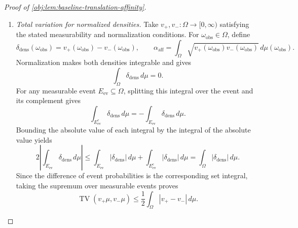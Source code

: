 \documentclass[11pt]{article}
\begin{document}
\begin{proof}[Proof of \cref{obj:lem:baseline-translation-affinity}]
\begin{enumerate}
For completeness, the product-defect bound follows by induction over subsets
\(\mathcal J\subseteq\{1,\ldots,B\}\). Every such product lies in \([0,1]\), and the empty subset gives equality. For
\(\ell_0\in\{1,\ldots,B\}\setminus\mathcal J\), the induction step is
\[
\begin{aligned}
1-\alpha_{\mathrm{aff},\ell_0}
      \prod_{\ell\in\mathcal J}\alpha_{\mathrm{aff},\ell}
&=(1-\alpha_{\mathrm{aff},\ell_0})
  +\alpha_{\mathrm{aff},\ell_0}
     \left(1-\prod_{\ell\in\mathcal J}\alpha_{\mathrm{aff},\ell}\right)\\
&\le (1-\alpha_{\mathrm{aff},\ell_0})
     +1-\prod_{\ell\in\mathcal J}\alpha_{\mathrm{aff},\ell}\\
&\le (1-\alpha_{\mathrm{aff},\ell_0})
     +\sum_{\ell\in\mathcal J}(1-\alpha_{\mathrm{aff},\ell}).
\end{aligned}
\]
Consequently,
\[
\begin{aligned}
\int_{\mathbb R^B}
\left(\sqrt{v_{\boldsymbol s}(y)}
      -\sqrt{v_{\boldsymbol t}(y)}\right)^2\,dy
&\le\sum_{\ell=1}^B\mathcal E_{\mathrm{Hel},\ell}\\
&\le\sum_{\ell=1}^B4\pi^2(s_\ell-t_\ell)^2,
\end{aligned}
\]
where the last inequality is the scalar translation estimate. When \(B=0\), both product densities equal \(1\) on the one-point space \(\mathbb R^0\), and both sides of the bound are zero.

\item \emph{Total variation for normalized densities.}
Take \(v_+,v_-:\Omega\to[0,\infty)\) satisfying the stated measurability and normalization conditions. For \(\omega_{\mathrm{obs}}\in\Omega\), define
\[
\delta_{\mathrm{dens}}(\omega_{\mathrm{obs}})=v_+(\omega_{\mathrm{obs}})-v_-(\omega_{\mathrm{obs}}),
\qquad
\alpha_{\mathrm{aff}}
=\int_\Omega\sqrt{v_+(\omega_{\mathrm{obs}})v_-(\omega_{\mathrm{obs}})}\,d\mu(\omega_{\mathrm{obs}}).
\]
Normalization makes both densities integrable and gives
\[
\int_\Omega\delta_{\mathrm{dens}}\,d\mu=0.
\]
For any measurable event \(E_{\mathrm{ev}}\subseteq\Omega\), splitting this integral over the event and its complement gives
\[
\int_{E_{\mathrm{ev}}^c}\delta_{\mathrm{dens}}\,d\mu
=-\int_{E_{\mathrm{ev}}}\delta_{\mathrm{dens}}\,d\mu.
\]
Bounding the absolute value of each integral by the integral of the absolute value yields
\[
2\left|\int_{E_{\mathrm{ev}}}\delta_{\mathrm{dens}}\,d\mu\right|
\le
\int_{E_{\mathrm{ev}}}|\delta_{\mathrm{dens}}|\,d\mu
+\int_{E_{\mathrm{ev}}^c}|\delta_{\mathrm{dens}}|\,d\mu
=\int_\Omega|\delta_{\mathrm{dens}}|\,d\mu.
\]
Since the difference of event probabilities is the corresponding set integral, taking the supremum over measurable events proves
\[
\operatorname{TV}(v_+\mu,v_-\mu)
\le\frac12\int_\Omega|v_+-v_-|\,d\mu.
\]


\end{enumerate}
\end{proof}
\end{document}
